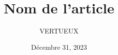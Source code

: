\documentclass[]{cls/tools}
\begin{document}
\title{Nom de l'article}

\author{VERTUEUX}
\date{Décembre 31, 2023}

\maketitle
\end{document}
